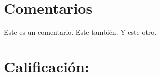 \documentclass{article}
\begin{document}
\maketitle

\section*{Comentarios}
\begin{enumerate}
     Este es un comentario.
     Este también.
     Y este otro.
\end{enumerate}

\section*{Calificación: \grade}

\end{document}
